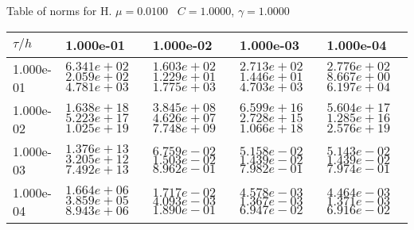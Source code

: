 \begin{center}
Table of norms for H. $\mu = 0.0100$ \, $C = 1.0000$, $\gamma = 1.0000$
  
\begin{tabular}{|p{1in}|p{1in}|p{1in}|p{1in}|p{1in}|} \hline
$\tau / h$ &1.000e-01 &1.000e-02 &1.000e-03 &1.000e-04 \\ \hline 
1.000e-01 & $6.341e+02$  $2.059e+02$  $4.781e+03$  & $1.603e+02$  $1.229e+01$  $1.775e+03$  & $2.713e+02$  $1.446e+01$  $4.703e+03$  & $2.776e+02$  $8.667e+00$  $6.197e+04$  \\ \hline 
1.000e-02 & $1.638e+18$  $5.223e+17$  $1.025e+19$  & $3.845e+08$  $4.626e+07$  $7.748e+09$  & $6.599e+16$  $2.728e+15$  $1.066e+18$  & $5.604e+17$  $1.285e+16$  $2.576e+19$  \\ \hline 
1.000e-03 & $1.376e+13$  $3.205e+12$  $7.492e+13$  & $6.759e-02$  $1.503e-02$  $8.962e-01$  & $5.158e-02$  $1.439e-02$  $7.982e-01$  & $5.143e-02$  $1.439e-02$  $7.974e-01$  \\ \hline 
1.000e-04 & $1.664e+06$  $3.859e+05$  $8.943e+06$  & $1.717e-02$  $4.093e-03$  $1.890e-01$  & $4.578e-03$  $1.367e-03$  $6.947e-02$  & $4.464e-03$  $1.371e-03$  $6.916e-02$  \\ \hline 

\end{tabular}\\[20pt]
\end{center}
